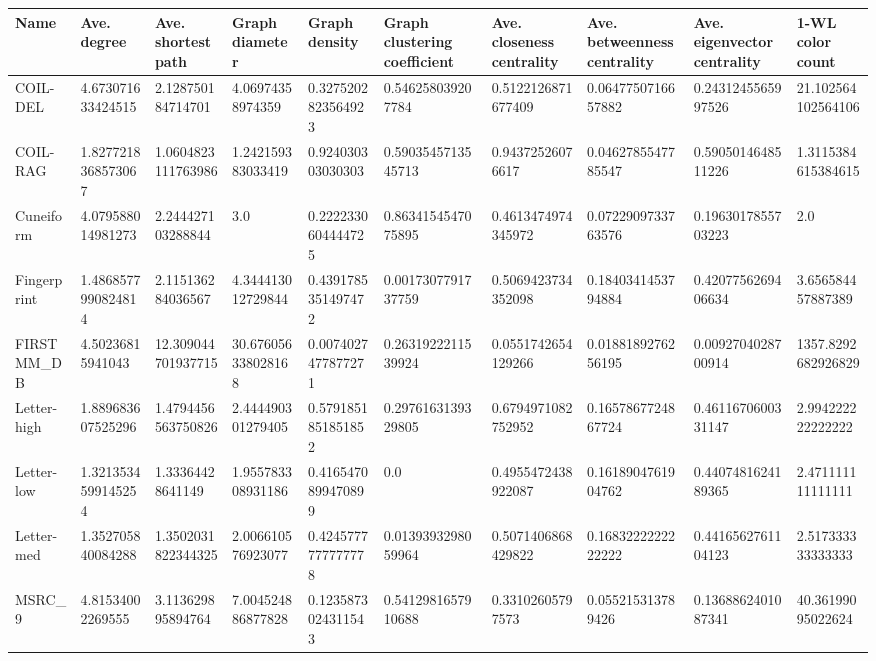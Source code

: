 \documentclass{article}
\begin{document}
\begin{table}[!ht]
    \footnotesize
    \centering
    \begin{tabular}{|l|l|l|l|l|l|l|l|l|l|}
    \hline
        \textbf{Name} & \textbf{Ave. degree} & \textbf{Ave. shortest path} & \textbf{Graph diameter} & \textbf{Graph density} & \textbf{Graph clustering coefficient} & \textbf{Ave. closeness centrality} & \textbf{Ave. betweenness centrality} & \textbf{Ave. eigenvector centrality} & \textbf{1-WL color count} \\ \hline
        COIL-DEL & 4.673071633424515 & 2.128750184714701 & 4.06974358974359 & 0.3275202823564923 & 0.546258039207784 & 0.5122126871677409 & 0.0647750716657882 & 0.2431245565997526 & 21.102564102564106 \\ \hline
        COIL-RAG & 1.8277218368573067 & 1.0604823111763986 & 1.242159383033419 & 0.924030303030303 & 0.5903545713545713 & 0.94372526076617 & 0.0462785547785547 & 0.5905014648511226 & 1.3115384615384615 \\ \hline
        Cuneiform & 4.079588014981273 & 2.244427103288844 & 3.0 & 0.2222330604444725 & 0.8634154547075895 & 0.4613474974345972 & 0.0722909733763576 & 0.1963017855703223 & 2.0 \\ \hline
        Fingerprint & 1.4868577990824814 & 2.115136284036567 & 4.344413012729844 & 0.4391785351497472 & 0.0017307791737759 & 0.5069423734352098 & 0.1840341453794884 & 0.4207756269406634 & 3.656584457887389 \\ \hline
        FIRSTMM\_DB & 4.50236815941043 & 12.309044701937715 & 30.676056338028168 & 0.0074027477877271 & 0.2631922211539924 & 0.0551742654129266 & 0.0188189276256195 & 0.0092704028700914 & 1357.8292682926829 \\ \hline
        Letter-high & 1.889683607525296 & 1.4794456563750826 & 2.444490301279405 & 0.5791851851851852 & 0.2976163139329805 & 0.6794971082752952 & 0.1657867724867724 & 0.4611670600331147 & 2.994222222222222 \\ \hline
        Letter-low & 1.3213534599145254 & 1.33364428641149 & 1.955783308931186 & 0.4165470899470899 & 0.0 & 0.4955472438922087 & 0.1618904761904762 & 0.4407481624189365 & 2.471111111111111 \\ \hline
        Letter-med & 1.352705840084288 & 1.3502031822344325 & 2.006610576923077 & 0.4245777777777778 & 0.0139393298059964 & 0.5071406868429822 & 0.1683222222222222 & 0.4416562761104123 & 2.517333333333333 \\ \hline
        MSRC\_9 & 4.81534002269555 & 3.113629895894764 & 7.004524886877828 & 0.1235873024311543 & 0.5412981657910688 & 0.33102605797573 & 0.055215313789426 & 0.1368862401087341 & 40.36199095022624 \\ \hline

\end{tabular}
\end{table}
\end{document}
